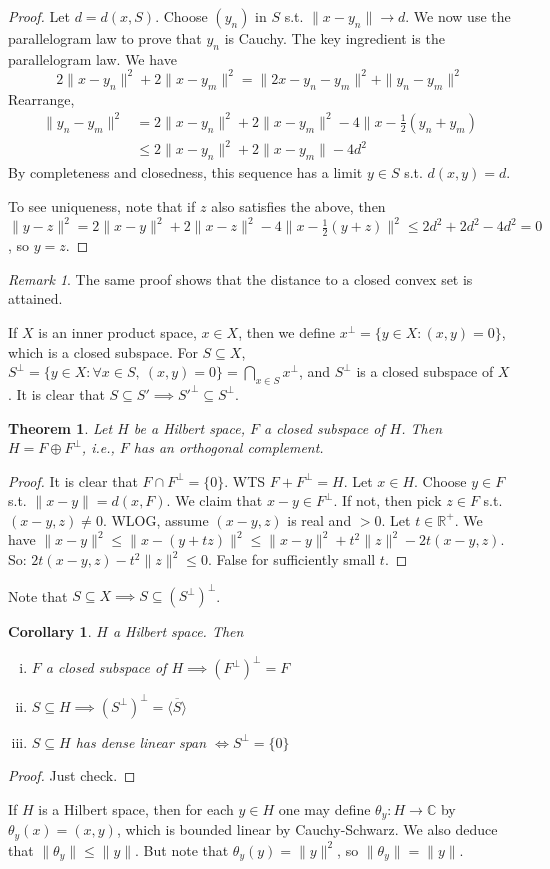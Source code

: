 \documentclass{article}
\theoremstyle{definition}
\theoremstyle{remark}
\newtheorem{rem}{Remark}
\theoremstyle{plain}
\newtheorem{thm}[defn]{Theorem}
\newtheorem{crly}[defn]{Corollary}
\newcommand{\RR}{\mathbb{R}}
\newcommand{\CC}{\mathbb{C}}
\begin{document}
\begin{proof}
    Let $d=d(x,S)$. Choose $(y_n)$ in $S$ s.t. $\|x-y_n\|\to d$.
    We now use the parallelogram law to prove that $y_n$ is Cauchy. The key ingredient is the parallelogram law. We have
    \[2\|x-y_n\|^2+2\|x-y_m\|^2=\|2x-y_n-y_m\|^2+\|y_n-y_m\|^2\]
    Rearrange,
    \begin{align*}\|y_n-y_m\|^2&=2\|x-y_n\|^2+2\|x-y_m\|^2-4\|x-\frac12(y_n+y_m)\\ &\le 2\|x-y_n\|^2+2\|x-y_m\|-4d^2\end{align*}
    By completeness and closedness, this sequence has a limit $y\in S$ s.t. $d(x,y)=d$.

    To see uniqueness, note that if $z$ also satisfies the above, then $\|y-z\|^2=2\|x-y\|^2+2\|x-z\|^2-4\|x-\frac12(y+z)\|^2\le 2d^2+2d^2-4d^2=0$, so $y=z$.
\end{proof}
\begin{rem}
    The same proof shows that the distance to a closed convex set is attained.
\end{rem}
If $X$ is an inner product space, $x\in X$, then we define $x^\perp=\{y\in X:(x,y)=0\}$, which is a closed subspace.
For $S\subseteq X$, $S^\perp=\{y\in X:\forall x\in S,\ (x,y)=0\}=\bigcap_{x\in S}x^\perp$, and $S^\perp$ is a closed subspace of $X$. It is clear that $S\subseteq S'\implies S'^\perp\subseteq S^\perp$.
\begin{thm}
    Let $H$ be a Hilbert space, $F$ a closed subspace of $H$. Then $H=F\oplus F^\perp$, i.e., $F$ has an orthogonal complement.
\end{thm}
\begin{proof}
    It is clear that $F\cap F^\perp=\{0\}$.
    WTS $F+F^\perp=H$. Let $x\in H$. Choose $y\in F$ s.t. $\|x-y\|=d(x,F)$. We claim that $x-y\in F^\perp$. If not, then pick $z\in F$ s.t. $(x-y,z)\neq 0$. WLOG, assume $(x-y,z)$ is real and $>0$. Let $t\in \RR^+$. We have $\|x-y\|^2\le \|x-(y+tz)\|^2\le \|x-y\|^2+t^2\|z\|^2-2t(x-y,z)$. So: $2t(x-y,z)-t^2\|z\|^2\le 0$. False for sufficiently small $t$.
\end{proof}
Note that $S\subseteq X\implies S\subseteq (S^\perp)^\perp$.
\begin{crly}
    $H$ a Hilbert space. Then
    \begin{enumerate}[(i)]
        \item $F$ a closed subspace of $H\implies (F^\perp)^\perp=F$
        \item $S\subseteq H\implies (S^\perp)^\perp=\overline{\langle S\rangle}$
        \item $S\subseteq H$ has dense linear span $\Leftrightarrow S^\perp=\{0\}$
    \end{enumerate}
\end{crly}
\begin{proof}
    Just check.
\end{proof}
If $H$ is a Hilbert space, then for each $y\in H$ one may define $\theta_y:H\to \CC$ by $\theta_y(x)=(x,y)$, which is bounded linear by Cauchy-Schwarz. We also deduce that $\|\theta_y\|\le \|y\|$. But note that $\theta_y(y)=\|y\|^2$, so $\|\theta_y\|=\|y\|$.
\end{document}
